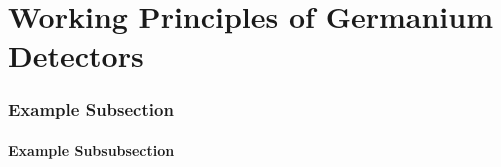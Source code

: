 \chapter{Working Principles of Germanium Detectors}

\subsection{Example Subsection}


\subsubsection{Example Subsubsection}


